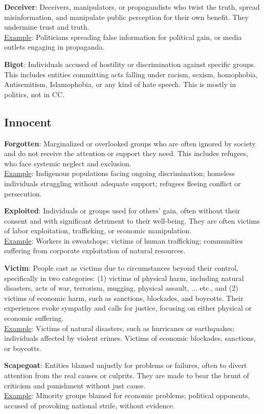 \textbf{Deceiver}: Deceivers, manipulators, or propagandists who twist the truth, spread misinformation, and manipulate public perception for their own benefit. They undermine trust and truth.
\\\underline{Example}: Politicians spreading false information for political gain, or media outlets engaging in propaganda.

\textbf{Bigot}: Individuals accused of hostility or discrimination against specific groups. This includes entities committing acts falling under racism, sexism, homophobia, Antisemitism, Islamophobia, or any kind of hate speech. This is mostly in politics, not in CC.


\subsection{Innocent}

\textbf{Forgotten}: Marginalized or overlooked groups who are often ignored by society and do not receive the attention or support they need. This includes refugees, who face systemic neglect and exclusion.
\\\underline{Example}: Indigenous populations facing ongoing discrimination; homeless individuals struggling without adequate support; refugees fleeing conflict or persecution.

\textbf{Exploited}: Individuals or groups used for others' gain, often without their consent and with significant detriment to their well-being. They are often victims of labor exploitation, trafficking, or economic manipulation.
\\\underline{Example}: Workers in sweatshops; victims of human trafficking; communities suffering from corporate exploitation of natural resources.

\textbf{Victim}: People cast as victims due to circumstances beyond their control, specifically in two categories: (1) victims of physical harm, including natural disasters, acts of war, terrorism, mugging, physical assault, ... etc., and (2) victims of economic harm, such as sanctions, blockades, and boycotts. Their experiences evoke sympathy and calls for justice, focusing on either physical or economic suffering.
\\\underline{Example}: Victims of natural disasters, such as hurricanes or earthquakes; individuals affected by violent crimes. Victims of economic blockades, sanctions, or boycotts.

\textbf{Scapegoat}: Entities blamed unjustly for problems or failures, often to divert attention from the real causes or culprits. They are made to bear the brunt of criticism and punishment without just cause.
\\\underline{Example}: Minority groups blamed for economic problems; political opponents, accused of provoking national strife, without evidence.

